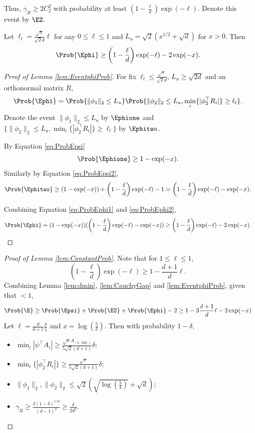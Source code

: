 Thus, $\gamma_R \ge 2C_2^2$ with probability at least $\left(1- \frac{\ell}{d}\right)\exp(-\ell)$.
Denote this event by $\EZ$.
\begin{lemma}
\label{lem:EventphiProb}
Let $\ell_l = \frac{\sqrt{\pi}}{\sqrt{2}d}\ell$ for any $0\le \ell\le 1$ and $ L_u = \sqrt{2}\left(x^{1/2}+\sqrt{d}\right)$ for $x>0$. Then
\[
\Prob{\Ephi} \ge \left(1- \frac{\ell}{d}\right)\exp(-\ell) - 2\exp(-x).
\]
\end{lemma}
\begin{proof}[Prrof of Lemma \ref{lem:EventphiProb}]
For fix $\ell_l\le \frac{\sqrt{\pi}}{\sqrt{2}d}$, $L_u \ge \sqrt{2d}$ and an orthonormal matrix $R$, 
\[
\Prob{\Ephi} = \Prob{\|\phi_1\|_2\le L_u}\Prob{\|\phi_2\|_2\le L_u, \min_i \{|\phi_2^{\top}R_i|\} \ge \ell_l}.
\]
Denote the event $\|\phi_1\|_2\le L_u$ by $\Ephione$ and $\{\|\phi_2\|_2\le L_u, \min_i \{|\phi_2^{\top}R_i|\} \ge \ell_l\}$ by $\Ephitwo$. 

By Equation \eqref{eq:ProbEpsi}
\begin{equation}
\label{eq:ProbEphi1}
\Prob{\Ephione} \ge 1-\exp(-x).
\end{equation}
Similarly by Equation \eqref{eq:ProbEpsi2},
\begin{equation}
\label{eq:ProbEphi2}
\Prob{\Ephitwo} \ge (1-\exp(-x))+\left(1- \frac{\ell}{d}\right)\exp(-\ell)-1 = \left(1- \frac{\ell}{d}\right)\exp(-\ell)-\exp(-x).
\end{equation}

Combining Equation \eqref{eq:ProbEphi1} and \eqref{eq:ProbEphi2},
\[
\Prob{\Ephi} = (1-\exp(-x))(\left(1- \frac{\ell}{d}\right)\exp(-\ell)-\exp(-x)) \ge \left(1- \frac{\ell}{d}\right)\exp(-\ell) - 2\exp(-x).
\]
\end{proof}

\begin{proof}[Proof of Lemma \ref{lem:ConstantProb}]
Note that for $1\le \ell \le 1$, 
\[
\left(1- \frac{\ell}{d}\right)\exp(-\ell) \ge 1-\frac{d+1}{d}\ell.
\]
Combining Lemma \ref{lem:dmin}, \ref{lem:CauchyGap} and \ref{lem:EventphiProb}, given that $<1$,
\[
\Prob{\E} \ge \Prob{\Epsi} + \Prob{\EZ} + \Prob{\Ephi} -2 \ge 1- 3\frac{d+1}{d}\ell- 2\exp(-x)  
\]
Let $\ell = \frac{d}{d+1}\frac{\delta}{5}$ and $ x= \log(\frac{5}{\delta})$.
Then with probability $1-\delta$, 
\begin{itemize}
\item $\min_i |\psi^{\top}A_i| \ge \frac{\sqrt{\pi}A_{(2,\min)}}{5\sqrt{2}(d+1)} \delta$;
\item $\min_i \{|\phi_2^{\top}R_i|\} \ge \frac{\sqrt{\pi}}{5\sqrt{2}(d+1)}\delta$;
\item $\|\phi_1\|_2, \|\phi_2\|_2 \le \sqrt{2}\left(\sqrt{\log(\frac{5}{\delta})}+\sqrt{d}\right)$;
\item $\gamma_R \ge \frac{\delta(1-\delta)^{1/d}}{(d-1)^2} \ge \frac{\delta}{2d^2}$.
\end{itemize}
\end{proof}


